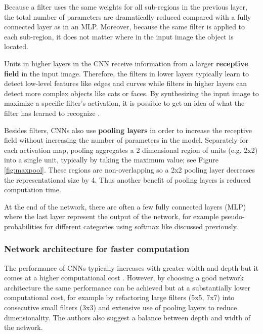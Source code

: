 Because a filter uses the same weights for all sub-regions in the previous layer, the total number of parameters are dramatically reduced compared with a fully connected layer as in an MLP. Moreover, because the same filter is applied to each sub-region, it does not matter where in the input image the object is located.

Units in higher layers in the CNN receive information from a larger \textbf{receptive field} in the input image. Therefore, the filters in lower layers typically learn to detect low-level features like edges and curves while filters in higher layers can detect more complex objects like cats or faces.
By synthesizing the input image to maximize a specific filter's activation, it is possible to get an idea of what the filter has learned to recognize \cite{VisualizeCnn}.




Besides filters, CNNs also use \textbf{pooling layers} in order to increase the receptive field without increasing the number of parameters in the model.
Separately for each activation map, pooling aggregates a 2 dimensional region of units (e.g. 2x2) into a single unit, typically by taking the maximum value; see Figure \ref{fig:maxpool}. These regions are non-overlapping so a 2x2 pooling layer decreases the representational size by 4. Thus another benefit of pooling layers is reduced computation time.

At the end of the network, there are often a few fully connected layers (MLP) where the last layer represent the output of the network, for example pseudo-probabilities for different categories using softmax like discussed previously.

\subsubsection{Network architecture for faster computation}

The performance of CNNs typically increases with greater width and depth but it comes at a higher computational cost \cite{InceptionV3}. However, by choosing a good network architecture the same performance can be achieved but at a substantially lower computational cost, for example by refactoring large filters (5x5, 7x7) into consecutive small filters (3x3) and extensive use of pooling layers to reduce dimensionality. The authors also suggest a balance between depth and width of the network.

